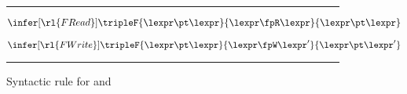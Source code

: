\begin{figure}
\hrule\vspace{5pt}

\[
   \infer[\rl{FRead}]{%
       \tripleF{ \lexpr \pt \lexpr }{ \lexpr \fpR \lexpr }{ \lexpr \pt \lexpr }
   }{}
\]

\[
   \infer[\rl{FWrite}]{%
       \tripleF{ \lexpr \pt \lexpr  }{  \lexpr \fpW \lexpr' }{ \lexpr \pt \lexpr' }
   }{}
\]




\hrule\vspace{5pt}
\caption{Syntactic rule for  and }
\label{fig:rule-prog}
\end{figure}

